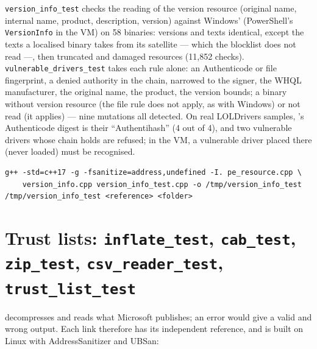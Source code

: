 \documentclass[11pt,a4paper,oneside]{report}
\begin{document}
\texttt{version\_info\_test} checks the reading of the version resource
(original name, internal name, product, description, version) against
Windows' (PowerShell's \texttt{VersionInfo} in the VM) on 58 binaries:
versions and texts identical, except the texts a localised binary takes from
its  satellite — which the blocklist does not read —, then
truncated and damaged resources (11,852 checks).
\texttt{vulnerable\_drivers\_test} takes each rule alone: an Authenticode or
file fingerprint, a denied authority in the chain, narrowed to the signer, the
WHQL manufacturer, the original name, the product, the version bounds; a
binary without version resource (the file rule does not apply, as with
Windows) or not read (it applies) — nine mutations all detected. On real
LOLDrivers samples, \wac{}'s Authenticode digest is their ``Authentihash'' (4
out of 4), and two vulnerable drivers whose chain holds are refused; in the
VM, a vulnerable driver placed there (never loaded) must be recognised.

\begin{lstlisting}
g++ -std=c++17 -g -fsanitize=address,undefined -I. pe_resource.cpp \
    version_info.cpp version_info_test.cpp -o /tmp/version_info_test
/tmp/version_info_test <reference> <folder>
\end{lstlisting}

\section{Trust lists: \texttt{inflate\_test}, \texttt{cab\_test}, \texttt{zip\_test}, \texttt{csv\_reader\_test}, \texttt{trust\_list\_test}}

 decompresses and reads what Microsoft publishes; an error
would give a valid and wrong output. Each link therefore has its independent
reference, and is built on Linux with AddressSanitizer and UBSan:
\end{document}
